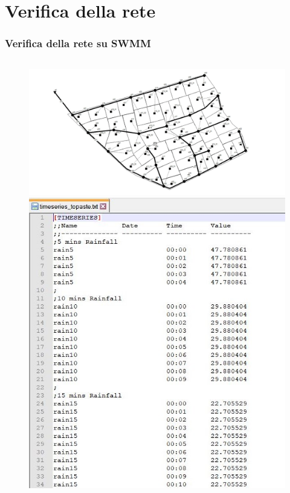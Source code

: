 \documentclass{beamer}
\begin{document}
\section{Verifica della rete}
\begin{frame}
 \frametitle{Verifica della rete su SWMM}
 
 \begin{columns}
  \begin{column}{.5\textwidth}
  \begin{figure}
   \centering
   \begin{overprint}
     \includegraphics[width=\linewidth]{images/map}
     \includegraphics[width=.98\linewidth]{images/timeseries}

\end{overprint}
\end{figure}
\end{column}
\end{columns}
\end{frame}
\end{document}
